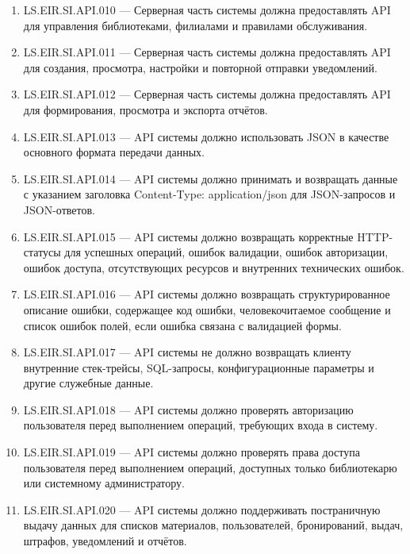 \documentclass[12pt,a4paper]{article}
\begin{document}
\begin{enumerate}
		\item LS.EIR.SI.API.010 --- Серверная часть системы должна предоставлять API
		для управления библиотеками, филиалами и правилами обслуживания.
		
		\item LS.EIR.SI.API.011 --- Серверная часть системы должна предоставлять API
		для создания, просмотра, настройки и повторной отправки уведомлений.
		
		\item LS.EIR.SI.API.012 --- Серверная часть системы должна предоставлять API
		для формирования, просмотра и экспорта отчётов.
		
		\item LS.EIR.SI.API.013 --- API системы должно использовать JSON в качестве
		основного формата передачи данных.
		
		\item LS.EIR.SI.API.014 --- API системы должно принимать и возвращать данные
		с указанием заголовка Content-Type: application/json для JSON-запросов
		и JSON-ответов.
		
		\item LS.EIR.SI.API.015 --- API системы должно возвращать корректные HTTP-статусы
		для успешных операций, ошибок валидации, ошибок авторизации, ошибок доступа,
		отсутствующих ресурсов и внутренних технических ошибок.
		
		\item LS.EIR.SI.API.016 --- API системы должно возвращать структурированное
		описание ошибки, содержащее код ошибки, человекочитаемое сообщение и список
		ошибок полей, если ошибка связана с валидацией формы.
		
		\item LS.EIR.SI.API.017 --- API системы не должно возвращать клиенту внутренние
		стек-трейсы, SQL-запросы, конфигурационные параметры и другие служебные данные.
		
		\item LS.EIR.SI.API.018 --- API системы должно проверять авторизацию пользователя
		перед выполнением операций, требующих входа в систему.
		
		\item LS.EIR.SI.API.019 --- API системы должно проверять права доступа пользователя
		перед выполнением операций, доступных только библиотекарю или системному
		администратору.
		
		\item LS.EIR.SI.API.020 --- API системы должно поддерживать постраничную выдачу
		данных для списков материалов, пользователей, бронирований, выдач, штрафов,
		уведомлений и отчётов.
	\end{enumerate}
	
\end{document}
